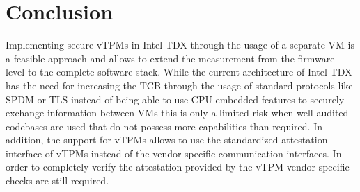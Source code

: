 \documentclass[sigplan,screen,nonacm]{acmart}
\begin{document}
\section{Conclusion}
Implementing secure vTPMs in Intel TDX through the usage of a separate VM is a feasible approach and allows to extend the measurement from the firmware level to the complete software stack.
While the current architecture of Intel TDX has the need for increasing the TCB through the usage of standard protocols like SPDM or TLS instead of being able to use CPU embedded features to securely exchange information between VMs this is only a limited risk when well audited codebases are used that do not possess more capabilities than required.
In addition, the support for vTPMs allows to use the standardized attestation interface of vTPMs instead of the vendor specific communication interfaces.
In order to completely verify the attestation provided by the vTPM vendor specific checks are still required.



\end{document}
